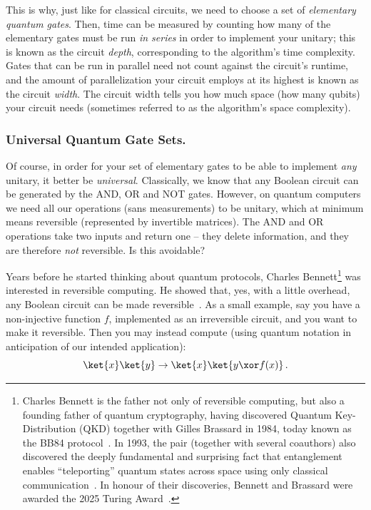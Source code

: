       This is why, just like for classical circuits, we need to choose a
        set of \emph{elementary quantum gates}. Then, time can be measured by
        counting how many of the elementary gates must be run \emph{in series}
        in order to implement your unitary; this is known as the circuit
        \emph{depth}, corresponding to the algorithm's time complexity. 
        Gates that can be run in parallel need not count against
        the circuit's runtime, and the amount of parallelization your circuit
        employs at its highest is known as the circuit \emph{width}. 
        The circuit width tells you how much space (how many qubits) your
        circuit needs (sometimes referred to as the algorithm's
        space complexity).

    \subsubsection{Universal Quantum Gate Sets.}
      Of course, in order for your set of elementary gates to be able to implement
        \emph{any} unitary, it better be \emph{universal}.
        Classically, we know that any Boolean circuit can be generated by the
        AND, OR and NOT gates. However, on quantum computers we need all our
        operations (sans measurements) to be unitary, which at minimum means
        reversible (represented by invertible matrices). The AND and OR
        operations take two inputs and return one -- they delete information,
        and they are therefore \emph{not} reversible. Is this avoidable?

      Years before he started thinking about quantum protocols, Charles
        Bennett\footnote{
          Charles Bennett is the father not only of reversible computing, but
          also a founding father of quantum cryptography, having discovered 
          Quantum Key-Distribution (QKD) together with Gilles Brassard in 1984,
          today known as the BB84 protocol~\cite{BenBra84}. In 1993, the pair (together with
          several coauthors) also discovered the deeply fundamental and
          surprising fact that entanglement enables 
          ``teleporting'' quantum states across space using only classical
          communication~\cite{BBCJPW93}. In honour of their discoveries, Bennett
          and Brassard were awarded the 2025 Turing Award~\cite{ACMTuring25}.
        } was interested in reversible computing. He showed that, yes, 
        with a little overhead, any Boolean
        circuit can be made reversible~\cite{Bennett73}. As a small example, say you have a
        non-injective function $f$, implemented as an irreversible circuit, and
        you want to make it reversible. Then you may instead compute
        (using quantum notation in anticipation of our intended application):
        \[
          \ket{x}\ket{y} \to \ket{x}\ket{y \xor f(x)}\, .
        \]

